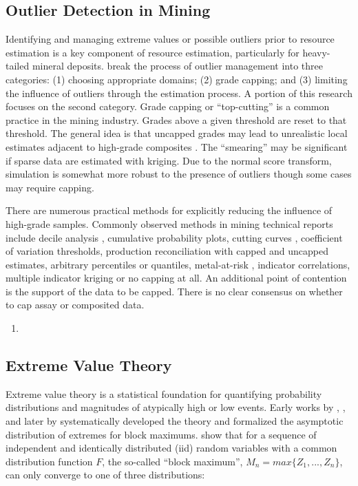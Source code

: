 \FloatBarrier
\subsection{Outlier Detection in Mining}
\label{subsec:01miningoutlier}

Identifying and managing extreme values or possible outliers prior to resource estimation is a key component of resource estimation, particularly for heavy-tailed mineral deposits. \cite{leuangthong2015dealing} break the process of outlier management into three categories: (1) choosing appropriate domains; (2) grade capping; and (3) limiting the influence of outliers through the estimation process. A portion of this research focuses on the second category. Grade capping or ``top-cutting'' is a common practice in the mining industry. Grades above a given threshold are reset to that threshold. The general idea is that uncapped grades may lead to unrealistic local estimates adjacent to high-grade composites \citep{nowak2013suggestions}. The ``smearing'' may be significant if sparse data are estimated with kriging. Due to the normal score transform, simulation is somewhat more robust to the presence of outliers though some cases may require capping.

There are numerous practical methods for explicitly reducing the influence of high-grade samples. Commonly observed methods in mining technical reports include decile analysis \citep{parrish1997geologist}, cumulative probability plots, cutting curves \citep{roscoe1996cutting}, coefficient of variation thresholds, production reconciliation with capped and uncapped estimates, arbitrary percentiles or quantiles, metal-at-risk \citep{parker2006}, indicator correlations, multiple indicator kriging or no capping at all. An additional point of contention is the support of the data to be capped. There is no clear consensus on whether to cap assay or composited data.


\begin{enumerate}
    \item \cite{babakhani2014geostatistical}
\end{enumerate}

\subsection{Extreme Value Theory}
\label{subsec:01evt}

Extreme value theory is a statistical foundation for quantifying probability distributions and magnitudes of atypically high or low events. Early works by \cite{frechet1927loi}, \cite{fisher1928limiting}, \cite{mises1936distribution} and later by \cite{gnedenko1943distribution}  systematically developed the theory and formalized the asymptotic distribution of extremes for block maximums. \cite{fisher1928limiting} show that for a sequence of independent and identically distributed (iid) random variables with a common distribution function $F$, the so-called ``block maximum'', $M_n = max\{Z_1,...,Z_n\}$, can only converge to one of three distributions:


